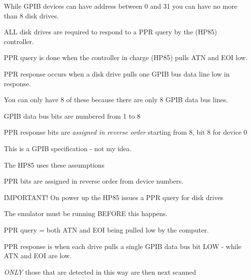 \begin{DoxyItemize}
\item While G\+P\+IB devices can have address between 0 and 31 you can have no more than 8 disk drives.
\item A\+LL disk drives are required to respond to a P\+PR query by the (H\+P85) controller.
\begin{DoxyItemize}
\item P\+PR query is done when the controller in charge (H\+P85) pulls A\+TN and E\+OI low.
\item P\+PR response occurs when a disk drive pulls one G\+P\+IB bus data line low in response.
\begin{DoxyItemize}
\item You can only have 8 of these because there are only 8 G\+P\+IB data bus lines.
\begin{DoxyItemize}
\item G\+P\+IB data bus bits are numbered from 1 to 8
\item P\+PR response bits are {\itshape assigned in reverse order} starting from 8, bit 8 for device 0
\begin{DoxyItemize}
\item This is a G\+P\+IB specification -\/ not my idea.
\end{DoxyItemize}
\item The H\+P85 uses these assumptions
\begin{DoxyItemize}
\item P\+PR bits are assigned in reverse order from device numbers.
\end{DoxyItemize}
\end{DoxyItemize}
\end{DoxyItemize}
\end{DoxyItemize}
\item I\+M\+P\+O\+R\+T\+A\+N\+T! On power up the H\+P85 issues a P\+PR query for disk drives
\begin{DoxyItemize}
\item The emulator must be running B\+E\+F\+O\+RE this happens.
\item P\+PR query = both A\+TN and E\+OI being pulled low by the computer.
\item P\+PR response is when each drive pulls a single G\+P\+IB data bus bit L\+OW -\/ while A\+TN and E\+OI are low.
\begin{DoxyItemize}
\item {\itshape O\+N\+LY} those that are detected in this way are then next scanned
\end{DoxyItemize}

\end{DoxyItemize}
\end{DoxyItemize}
